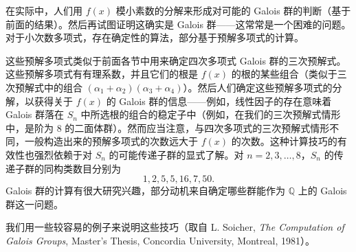 在实际中，人们用 $f(x)$ 模小素数的分解来形成对可能的 Galois 群的判断（基于前面的结果）。然后再试图证明这确实是 Galois 群——这常常是一个困难的问题。对于小次数多项式，存在确定性的算法，部分基于预解多项式的计算。

这些预解多项式类似于前面各节中用来确定四次多项式 Galois 群的三次预解式。这些预解多项式有有理系数，并且它们的根是 $f(x)$ 的根的某些组合（类似于三次预解式中的组合 $(\alpha_1+\alpha_2)(\alpha_3+\alpha_4)$）。然后人们确定这些预解多项式的分解，以获得关于 $f(x)$ 的 Galois 群的信息——例如，线性因子的存在意味着 Galois 群落在 $S_n$ 中所选根的组合的稳定子中（例如，在我们的三次预解式情形中，是阶为 $8$ 的二面体群）。然而应当注意，与四次多项式的三次预解式情形不同，一般构造出来的预解多项式的次数远大于 $f(x)$ 的次数。这种计算技巧的有效性也强烈依赖于对 $S_n$ 的可能传递子群的显式了解。对 $n=2,3,\ldots,8$，$S_n$ 的传递子群的同构类数目分别为
\[
1,2,5,5,16,7,50.
\]
Galois 群的计算有很大研究兴趣，部分动机来自确定哪些群能作为 $\mathbb Q$ 上的 Galois 群这一问题。

我们用一些较容易的例子来说明这些技巧（取自 L. Soicher, \emph{The Computation of Galois Groups}, Master's Thesis, Concordia University, Montreal, 1981）。

